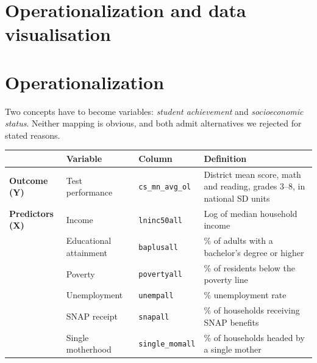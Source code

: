 \documentclass[
]{article}
\newcounter{none} %
\begin{document}
\section{Operationalization and data
visualisation}\label{operationalization-and-data-visualisation}

\section{Operationalization}\label{operationalization}

Two concepts have to become variables: \emph{student achievement} and
\emph{socioeconomic status}. Neither mapping is obvious, and both admit
alternatives we rejected for stated reasons.

{\def\LTcaptype{none} %
\begin{longtable}[]{@{}
  >{\raggedright\arraybackslash}p{}
  >{\raggedright\arraybackslash}p{}
  >{\raggedright\arraybackslash}p{}
  >{\raggedright\arraybackslash}p{}@{}}
\toprule\noalign{}
\begin{minipage}[b]{\linewidth}\raggedright
\end{minipage} & \begin{minipage}[b]{\linewidth}\raggedright
Variable
\end{minipage} & \begin{minipage}[b]{\linewidth}\raggedright
Column
\end{minipage} & \begin{minipage}[b]{\linewidth}\raggedright
Definition
\end{minipage} \\
\midrule\noalign{}
\endhead
\bottomrule\noalign{}
\endlastfoot
\textbf{Outcome (Y)} & Test performance & \texttt{cs\_mn\_avg\_ol} &
District mean score, math and reading, grades 3--8, in national SD
units \\
\textbf{Predictors (X)} & Income & \texttt{lninc50all} & Log of median
household income \\
& Educational attainment & \texttt{baplusall} & \% of adults with a
bachelor's degree or higher \\
& Poverty & \texttt{povertyall} & \% of residents below the poverty
line \\
& Unemployment & \texttt{unempall} & \% unemployment rate \\
& SNAP receipt & \texttt{snapall} & \% of households receiving SNAP
benefits \\
& Single motherhood & \texttt{single\_momall} & \% of households headed
by a single mother \\
\end{longtable}
}
\end{document}
